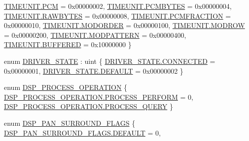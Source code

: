 \begin{DoxyCompactItemize}
\hyperlink{namespace_f_m_o_d_aff20975332f93ff2180d2681cb43929fa1088fbc901dc88b6c18085220cc33de9}{T\+I\+M\+E\+U\+N\+I\+T.\+P\+CM} = 0x00000002, 
\hyperlink{namespace_f_m_o_d_aff20975332f93ff2180d2681cb43929facf0db13269486cdbd8d56b1734cf7ae1}{T\+I\+M\+E\+U\+N\+I\+T.\+P\+C\+M\+B\+Y\+T\+ES} = 0x00000004, 
\hyperlink{namespace_f_m_o_d_aff20975332f93ff2180d2681cb43929fa31269368c43bd5437f61c6fdb0eb0e37}{T\+I\+M\+E\+U\+N\+I\+T.\+R\+A\+W\+B\+Y\+T\+ES} = 0x00000008, 
\newline
\hyperlink{namespace_f_m_o_d_aff20975332f93ff2180d2681cb43929fadeb066fd92f8ad0b23b83e10400eb2f0}{T\+I\+M\+E\+U\+N\+I\+T.\+P\+C\+M\+F\+R\+A\+C\+T\+I\+ON} = 0x00000010, 
\hyperlink{namespace_f_m_o_d_aff20975332f93ff2180d2681cb43929fa3b1f6fac8e61c214149924de8bf98da0}{T\+I\+M\+E\+U\+N\+I\+T.\+M\+O\+D\+O\+R\+D\+ER} = 0x00000100, 
\hyperlink{namespace_f_m_o_d_aff20975332f93ff2180d2681cb43929fa323c38f3bfade4474e901d952bd321c2}{T\+I\+M\+E\+U\+N\+I\+T.\+M\+O\+D\+R\+OW} = 0x00000200, 
\hyperlink{namespace_f_m_o_d_aff20975332f93ff2180d2681cb43929fa649834f1e029455a4b76772195e1fb6c}{T\+I\+M\+E\+U\+N\+I\+T.\+M\+O\+D\+P\+A\+T\+T\+E\+RN} = 0x00000400, 
\newline
\hyperlink{namespace_f_m_o_d_aff20975332f93ff2180d2681cb43929fa4f975b2c2ace2dbe48e5f3c123b70c52}{T\+I\+M\+E\+U\+N\+I\+T.\+B\+U\+F\+F\+E\+R\+ED} = 0x10000000
 \}
\item 
enum \hyperlink{namespace_f_m_o_d_a0fa62396ce674d121c3f766c24942924}{D\+R\+I\+V\+E\+R\+\_\+\+S\+T\+A\+TE} \+: uint \{ \hyperlink{namespace_f_m_o_d_a0fa62396ce674d121c3f766c24942924aa5afd6edd5336d91316964e493936858}{D\+R\+I\+V\+E\+R\+\_\+\+S\+T\+A\+T\+E.\+C\+O\+N\+N\+E\+C\+T\+ED} = 0x00000001, 
\hyperlink{namespace_f_m_o_d_a0fa62396ce674d121c3f766c24942924a5b39c8b553c821e7cddc6da64b5bd2ee}{D\+R\+I\+V\+E\+R\+\_\+\+S\+T\+A\+T\+E.\+D\+E\+F\+A\+U\+LT} = 0x00000002
 \}
\item 
enum \hyperlink{namespace_f_m_o_d_a4972a4698fe1c6d24a9b2f3704dfe42e}{D\+S\+P\+\_\+\+P\+R\+O\+C\+E\+S\+S\+\_\+\+O\+P\+E\+R\+A\+T\+I\+ON} \{ \hyperlink{namespace_f_m_o_d_a4972a4698fe1c6d24a9b2f3704dfe42eabeb2f4e16e1347f2e3a38e51496a92cf}{D\+S\+P\+\_\+\+P\+R\+O\+C\+E\+S\+S\+\_\+\+O\+P\+E\+R\+A\+T\+I\+O\+N.\+P\+R\+O\+C\+E\+S\+S\+\_\+\+P\+E\+R\+F\+O\+RM} = 0, 
\hyperlink{namespace_f_m_o_d_a4972a4698fe1c6d24a9b2f3704dfe42ea6f1c789bf25a5468d9e3ebc9836f7cdf}{D\+S\+P\+\_\+\+P\+R\+O\+C\+E\+S\+S\+\_\+\+O\+P\+E\+R\+A\+T\+I\+O\+N.\+P\+R\+O\+C\+E\+S\+S\+\_\+\+Q\+U\+E\+RY}
 \}
\item 
enum \hyperlink{namespace_f_m_o_d_a261a23e0e5c15d202fa47817d62b512c}{D\+S\+P\+\_\+\+P\+A\+N\+\_\+\+S\+U\+R\+R\+O\+U\+N\+D\+\_\+\+F\+L\+A\+GS} \{ \hyperlink{namespace_f_m_o_d_a261a23e0e5c15d202fa47817d62b512ca5b39c8b553c821e7cddc6da64b5bd2ee}{D\+S\+P\+\_\+\+P\+A\+N\+\_\+\+S\+U\+R\+R\+O\+U\+N\+D\+\_\+\+F\+L\+A\+G\+S.\+D\+E\+F\+A\+U\+LT} = 0, 

\end{DoxyCompactItemize}
